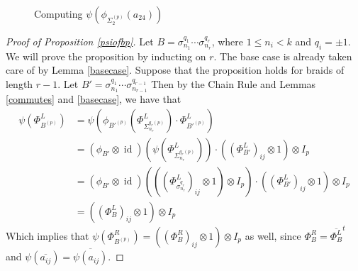 \documentclass{amsart}[11pt,fullpage]
\newcommand{\oarc}[4]{
\draw[thick, postaction={on each segment={mid arrow}}] (#1,#2) ..controls (#1 + .2,#2 + .7) and (#3 - .2,#4 + .7) .. (#3,#4);
}
\def\s{{\sigma}}
\newcommand\id{\operatorname{id}}
\newcommand\Sp{\Sigma^{(p)}}
\theoremstyle{definition}
\begin{document}
\begin{figure}[ht]
\caption{Computing $\psi(\phi_{\Sp_2}(a_{24}))$}
\label{FigCommutes}
\end{figure}




\begin{proof} [Proof of Proposition \ref{psiofbp}]
Let $B = \s_{n_1}^{q_1}\cdots\s_{n_r}^{q_r}$, where $1\le n_i<k$ and $q_i = \pm 1$. We will prove the proposition by inducting on $r$. The base case is already taken care of by Lemma \ref{basecase}. Suppose that the proposition holds for braids of length $r-1$. Let $B' =\s_{n_1}^{q_1}\cdots\s_{n_{r-1}}^{q_{r-1}}$ Then by the Chain Rule and Lemmas \ref{commutes} and \ref{basecase}, we have that
\begin{align*}
\psi\left(\Phi_{B^{(p)}}^L\right) &= \psi\left(\phi_{B'^{(p)}}\left(\Phi_{\Sigma^{q_r(p)}_{n_r}}^L\right)\cdot\Phi_{B'^{(p)}}^L\right)\\
&= \left(\phi_{B'}\otimes\id\right)\left(\psi\left(\Phi_{\Sigma^{q_r(p)}_{n_r}}^L\right)\right)\cdot \left(\left(\Phi_{B'}^L\right)_{ij}\otimes 1\right)\otimes I_p\\
&= \left(\phi_{B'}\otimes\id\right)\left(\left(\left(\Phi_{\s_{n_r}^{q_r}}^L\right)_{ij}\otimes 1\right)\otimes I_p\right)\cdot \left(\left(\Phi_{B'}^L\right)_{ij}\otimes 1\right)\otimes I_p\\
&= \left(\left(\Phi_{B}^L\right)_{ij}\otimes 1\right)\otimes I_p
\end{align*}
Which implies that $\psi\left(\Phi_{B^{(p)}}^R\right) = \left(\left(\Phi_{B}^R\right)_{ij}\otimes 1\right)\otimes I_p$ as well, since $\Phi_B^R = \overline{\Phi_B^L}^t$ and $\psi(\overline{a_{ij}}) = \overline{\psi(a_{ij})}$.
\end{proof}
\end{document}
